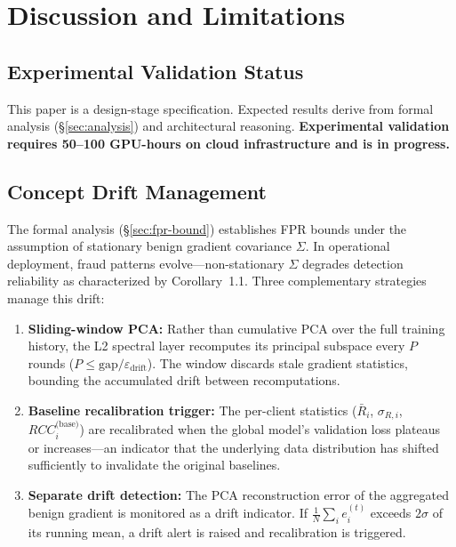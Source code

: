 \documentclass[10pt,journal]{IEEEtran}
\begin{document}
\section{Discussion and Limitations}
\label{sec:discussion}

\subsection{Experimental Validation Status}

This paper is a design-stage specification. Expected results derive from formal analysis (\S\ref{sec:analysis}) and architectural reasoning. \textbf{Experimental validation requires 50--100 GPU-hours on cloud infrastructure and is in progress.}

\subsection{Concept Drift Management}

The formal analysis (\S\ref{sec:fpr-bound}) establishes FPR bounds under the assumption of stationary benign gradient covariance $\Sigma$. In operational deployment, fraud patterns evolve---non-stationary $\Sigma$ degrades detection reliability as characterized by Corollary~1.1. Three complementary strategies manage this drift:

\begin{enumerate}
  \item \textbf{Sliding-window PCA:} Rather than cumulative PCA over the full training history, the L2 spectral layer recomputes its principal subspace every $P$ rounds ($P \le \text{gap} / \varepsilon_{\text{drift}}$). The window discards stale gradient statistics, bounding the accumulated drift between recomputations.
  \item \textbf{Baseline recalibration trigger:} The per-client statistics ($\bar{R}_i$, $\sigma_{R,i}$, $RCC_i^{\text{(base)}}$) are recalibrated when the global model's validation loss plateaus or increases---an indicator that the underlying data distribution has shifted sufficiently to invalidate the original baselines.
  \item \textbf{Separate drift detection:} The PCA reconstruction error of the aggregated benign gradient is monitored as a drift indicator. If $\frac{1}{N} \sum_i e_i^{(t)}$ exceeds $2\sigma$ of its running mean, a drift alert is raised and recalibration is triggered.
\end{enumerate}
\end{document}
